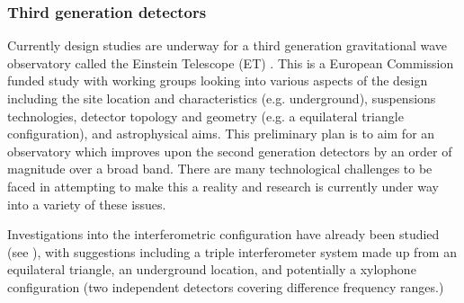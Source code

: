 \documentclass{article}
\begin{document}
\subsubsection{Third generation detectors}
Currently design studies are underway for a third generation gravitational wave
observatory called the Einstein Telescope (ET) \cite{ETweb}. This is a European
Commission funded study with working groups looking into various aspects of the
design including the site location and characteristics (e.g. underground),
suspensions technologies, detector topology and geometry (e.g. a equilateral
triangle configuration), and astrophysical aims. This preliminary plan is to
aim for an observatory which improves upon the second generation detectors by
an order of magnitude over a broad band. There are many technological
challenges to be faced in attempting to make this a reality and research is
currently under way into a variety of these issues.

Investigations into the interferometric configuration have already been studied
(see \cite{Freise:2008, Hild:2008}), with suggestions including a triple 
interferometer system made up from an equilateral triangle, an underground 
location, and potentially a xylophone configuration (two independent detectors 
covering difference frequency ranges.)



\end{document}
